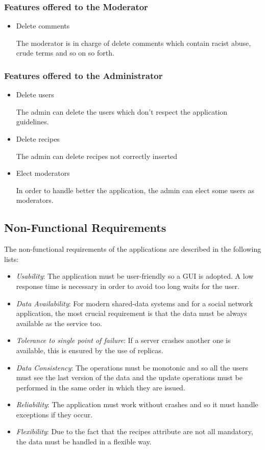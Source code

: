 \documentclass[a4paper]{report}
\begin{document}
\subsubsection{Features offered to the Moderator}
\begin{itemize}
	\item Delete comments
	
	\noindent The moderator is in charge of delete comments which contain racist abuse, crude terms and so on so forth.
\end{itemize}

\subsubsection{Features offered to the Administrator}
\begin{itemize}
	\item Delete users
	
	\noindent The admin can delete the users which don't respect the application guidelines.
	
	\item Delete recipes
	
	\noindent The admin can delete recipes not correctly inserted
	
	\item Elect moderators
	
	\noindent In order to handle better the application, the admin can elect some users as moderators.
\end{itemize}
\subsection{Non-Functional Requirements}
The non-functional requirements of the applications are described in the following lists:
\begin{itemize}
	\item \emph{Usability}: The application must be user-friendly so a GUI is adopted. A low response time is necessary in order to avoid too long waits for the user.
	\item \emph{Data Availability}: For modern shared-data systems and for a social network application, the most crucial requirement is that the data must be always available as the service too.
	\item \emph{Tolerance to single point of failure}: If a server crashes another one is available, this is ensured by the use of replicas.
	\item \emph{Data Consistency}: The operations must be monotonic and so all the users must see the last version of the data and the update operations must be performed in the same order in which they are issued.

	\item \emph{Reliability}: The application must work without crashes and so it must handle exceptions if they occur.
	
	\item \emph{Flexibility}: Due to the fact that the recipes attribute are not all mandatory, the data must be handled in a flexible way.  
\end{itemize}
\newpage
\end{document}
